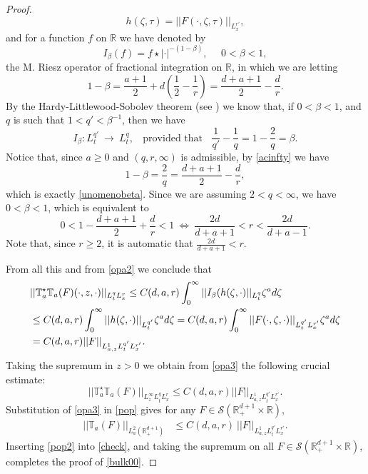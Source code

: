 \documentclass[11pt,letter]{amsart}
\def \RN {\mathbb{R}_+^{d+1}}
\def \R {\mathbb{R}}
\numberwithin{equation}{section}
\numberwithin{equation}{section}
\begin{document}
\begin{proof}
\begin{equation}
h(\zeta, \tau) = ||F(\cdot,\zeta,\tau)||_{L^{r'}_x},
\end{equation}
and for a function $f$ on $\R$ we have denoted by
\begin{equation}\label{marcel}
I_\beta(f) = f\star |\cdot |^{-(1-\beta)},\ \ \ \ \ \ 0<\beta<1,   
\end{equation} 
the M. Riesz operator of fractional integration on $\R$, in which we are letting
\begin{equation}\label{unomenobeta}
1-\beta = \frac{a+1}2+d(\frac 12 - \frac 1r) = \frac{d+a+1}2 - \frac dr.
\end{equation}
By the Hardy-Littlewood-Sobolev theorem (see \cite{St}) we know that, if $0<\beta<1$, and $q$ is such that $1<q'<\beta^{-1}$, then we have
\begin{equation}\label{marcello}
I_\beta : L^{q'}_t\ \longrightarrow\ L^q_t,\ \ \ \ \text{provided that}\ \ \ \ \frac{1}{q'} - \frac 1q = 1- \frac 2q = \beta.
\end{equation}
Notice that, since $a\ge 0$ and $(q,r,\infty)$ is admissible, by \eqref{acinfty} we have
\[
1-\beta = \frac 2q = \frac{d+a+1}2 - \frac dr,
\]
which is exactly 
\eqref{unomenobeta}. Since we are assuming $2<q<\infty$, we have $0<\beta<1$, which is equivalent to 
\[
0<1- \frac{d+a+1}2 + \frac dr <1\ \Longleftrightarrow\ \frac{2d}{d+a+1}< r < \frac{2d}{d+a-1}.
\]
Note that, since $r\ge 2$, it is automatic that $\frac{2d}{d+a+1}< r$.
 
From all this and from \eqref{opa2} we conclude that
\begin{align}\label{opa3}
& ||\mathbb T_a^\star \mathbb T_a(F)(\cdot,z,\cdot)||_{L^q_t L^r_x} \le C(d,a,r) \int_0^\infty ||I_\beta(h(\zeta,\cdot)||_{L^{q}_t} \zeta^a d\zeta
\\
& \le C(d,a,r) \int_0^\infty ||h(\zeta,\cdot)||_{L^{q'}_t} \zeta^a d\zeta = C(d,a,r) \int_0^\infty ||F(\cdot,\zeta,\cdot)||_{L^{q'}_t L^{r'}_x} \zeta^a d\zeta
\notag\\
& = C(d,a,r) ||F||_{L^1_{a,z} L^{q'}_t L^{r'}_x}.
\notag
\end{align}
Taking the supremum in $z>0$ we obtain from \eqref{opa3} the following crucial estimate:
\begin{equation}\label{opa4}
||\mathbb T_a^\star \mathbb T_a(F)||_{L^\infty_z L^q_t L^r_x} \le C(d,a,r) ||F||_{L^1_{a,z} L^{q'}_t L^{r'}_x}.
\end{equation}
Substitution of \eqref{opa3} in \eqref{pop} gives for any $F\in \mathscr S(\RN\times \R)$,
\begin{align}\label{pop2}
||\mathbb T_a(F)||_{L_a^2(\RN)} & \le C(d,a,r)\ ||F||_{L^1_{a,z} L^{q'}_t L^{r'}_x }.
\end{align}
Inserting \eqref{pop2} into \eqref{check}, and taking the supremum on all $F\in \mathscr S(\RN\times \R)$,  completes the proof of \eqref{bulk00}.


\end{proof}
\end{document}
